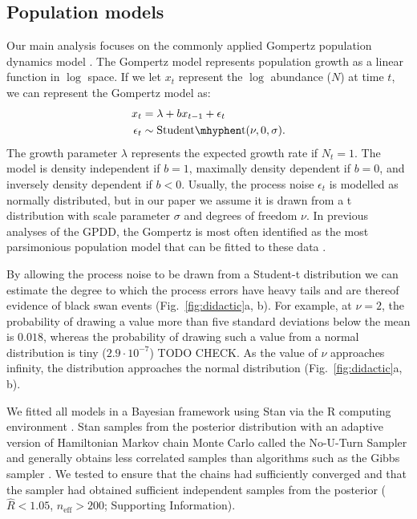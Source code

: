 \subsection{Population models}

Our main analysis focuses on the commonly applied Gompertz population dynamics model \citep[e.g.][]{knape2012,dennis2014,connors2014}. The Gompertz model represents population growth as a linear function in $\log$ space. If we let $x_t$ represent the $\log$ abundance ($N$) at time $t$, we can represent the Gompertz model as:
\begin{align*}
x_t &= \lambda + b x_{t-1} + \epsilon_t\\
\epsilon_t &\sim \mathrm{Student\mhyphen t}(\nu, 0, \sigma).
\end{align*}
The growth parameter $\lambda$ represents the expected growth rate if $N_t = 1$. The model is density independent if $b = 1$, maximally density dependent if $b = 0$, and inversely density dependent if $b < 0$. Usually, the process noise $\epsilon_t$ is modelled as normally distributed, but in our paper we assume it is drawn from a t distribution with scale parameter $\sigma$ and degrees of freedom $\nu$. In previous analyses of the GPDD, the Gompertz is most often identified as the most parsimonious population model that can be fitted to these data \citep{brook2006}.

By allowing the process noise to be drawn from a Student-t distribution we can estimate the degree to which the process errors have heavy tails and are thereof evidence of black swan events (Fig.~\ref{fig:didactic}a, b). For example, at $\nu = 2$, the probability of drawing a value more than five standard deviations below the mean is $0.018$, whereas the probability of drawing such a value from a normal distribution is tiny ($2.9\cdot10^{-7}$) TODO CHECK. As the value of $\nu$ approaches infinity, the distribution approaches the normal distribution (Fig.~\ref{fig:didactic}a, b).


We fitted all models in a Bayesian framework using Stan \citep{stan-manual2014} via the R computing environment \citep{r2014}. Stan samples from the posterior distribution with an adaptive version of Hamiltonian Markov chain Monte Carlo called the No-U-Turn Sampler and generally obtains less correlated samples than algorithms such as the Gibbs sampler \citep{hoffman2014}. We tested to ensure that the chains had sufficiently converged and that the sampler had obtained sufficient independent samples from the posterior ($\widehat{R} < 1.05$, $n_\mathrm{eff} > 200$; Supporting Information).

